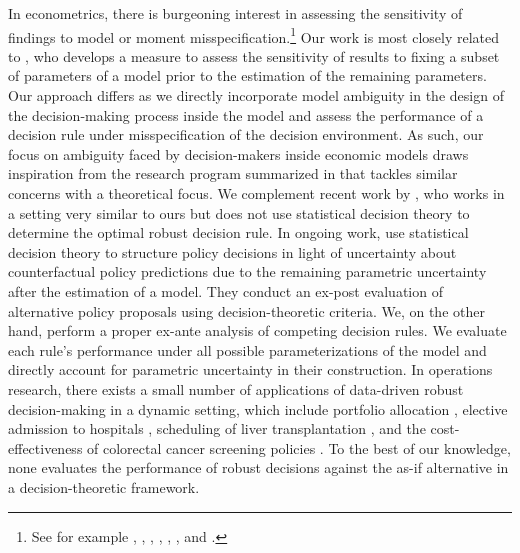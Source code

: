 {In econometrics, there is burgeoning interest in assessing the sensitivity of findings to model or moment misspecification.\footnote{See for example \cite{Andrews.2020}, \cite{Andrews.2017}, \cite{Armstrong.2021}, \cite{Bonhomme.2020}, \cite{Chernozhukov.2020},  \cite{Christensen.2019}, and \cite{Honore.2020}.} Our work is most closely related to \cite{Jorgensen.2021}, who develops a measure to assess the sensitivity of results to fixing a subset of parameters of a model prior to the estimation of the remaining parameters. Our approach differs as we directly incorporate model ambiguity in the design of the decision-making process inside the model and assess the performance of a decision rule under misspecification of the decision environment. As such, our focus on ambiguity faced by decision-makers inside economic models draws inspiration from the research program summarized in \cite{Hansen.2016} that tackles similar concerns with a theoretical focus. We complement recent work by \cite{Saghafian.2018}, who works in a setting very similar to ours but does not use statistical decision theory to determine the optimal robust decision rule. In ongoing work, \cite{Eisenhauer.2021} use statistical decision theory to structure policy decisions in light of uncertainty about counterfactual policy predictions due to the remaining parametric uncertainty after the estimation of a model. They conduct an ex-post evaluation of alternative policy proposals using decision-theoretic criteria. We, on the other hand, perform a proper ex-ante analysis of competing decision rules. We evaluate each rule's performance under all possible parameterizations of the model and directly account for parametric uncertainty in their construction. In operations research, there exists a small number of applications of data-driven robust decision-making in a dynamic setting, which include portfolio allocation \cite{Zymler.2013}, elective admission to hospitals \cite{Meng.2015}, scheduling of liver transplantation \cite{Kaufman.2017}, and the cost-effectiveness of colorectal cancer screening policies \cite{Goh.2018}. To the best of our knowledge, none evaluates the performance of robust decisions against the as-if alternative in a decision-theoretic framework.\


\newpage


%


%


}  %
